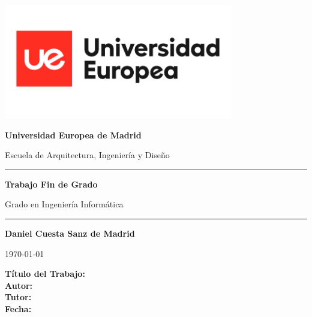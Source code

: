 
\begin{titlepage}
    \centering
    \vspace{1cm}
    
    \includegraphics[height=5cm]{logo.png} 
    \vspace{1cm}
    
    {\LARGE \textbf{Universidad Europea de Madrid} \par}
    {\Large Escuela de Arquitectura, Ingeniería y Diseño \par}
    
    \vspace{3cm}
    
    \noindent\rule{12cm}{1.5pt}
    
    \vspace{0.8cm}
    
    {\huge \textbf{Trabajo Fin de Grado} \par}
    
    \vspace{0.5cm}
    
    {\Large Grado en Ingeniería Informática \par}
    
    \vspace{0.8cm}
    
    \noindent\rule{12cm}{1.5pt}
    
    \vfill
    
    {\Large \textbf{Daniel Cuesta Sanz de Madrid} \par}
    
    \vspace{1cm}
    
    {\large \today \par}
    
\end{titlepage}

\setcounter{page}{1}
\newpage



\textbf{\Large Título del Trabajo:} \\
\vfill
\textbf{\Large Autor:} \\
\vfill
\textbf{\Large Tutor:} \\
\vfill
\textbf{\Large Fecha:} \\
\vfill

\newpage